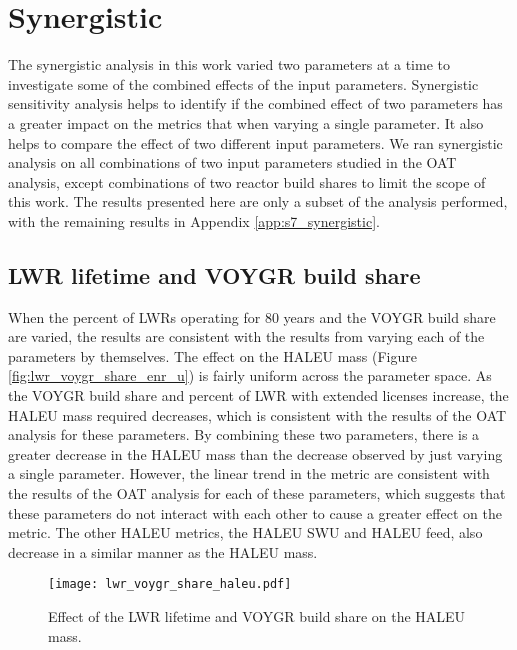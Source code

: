 \section{Synergistic}\label{sec:synergistic}
The synergistic analysis in this work varied two parameters at a time to 
investigate some of the combined effects of the input parameters. Synergistic 
sensitivity analysis helps to identify if the combined effect of two parameters 
has a greater impact on the metrics that when varying a single parameter. 
It also helps to compare the effect of two different input parameters. 
We ran synergistic 
analysis on all combinations of two input parameters studied in the \gls{OAT} 
analysis, except combinations of two reactor build shares to limit 
the scope of this work. The
results presented here are only a subset of the analysis performed, 
with the remaining results in Appendix \ref{app:s7_synergistic}.

\subsection{LWR lifetime and VOYGR build share}
When the percent of \glspl{LWR} operating for 80 years and the VOYGR build share 
are varied, the results are consistent with the results from varying 
each of the parameters by themselves. The effect on the \gls{HALEU} mass 
(Figure \ref{fig:lwr_voygr_share_enr_u}) is fairly uniform across the 
parameter space. As the VOYGR build share and percent of \gls{LWR} with 
extended licenses increase, the \gls{HALEU} mass required decreases, 
which is consistent with the results of the \gls{OAT} analysis for these 
parameters. By combining these two parameters, there is a greater 
decrease in the \gls{HALEU} mass than the decrease observed by just varying 
a single parameter. However, the linear trend in the metric
are consistent with the results of the \gls{OAT} analysis for 
each of these parameters, which suggests that these parameters do not 
interact with each other to cause a greater effect on the metric. 
The other \gls{HALEU} metrics, the \gls{HALEU} \gls{SWU} 
and \gls{HALEU} feed, also decrease in a similar manner as the \gls{HALEU} mass. 

\begin{figure}[h!]
    \centering
    \texttt{[image: lwr\_voygr\_share\_haleu.pdf]}
    \caption{Effect of the LWR lifetime and VOYGR build share on the HALEU mass.}
    \label{fig:lwr_voygr_share_haleu}
\end{figure}

